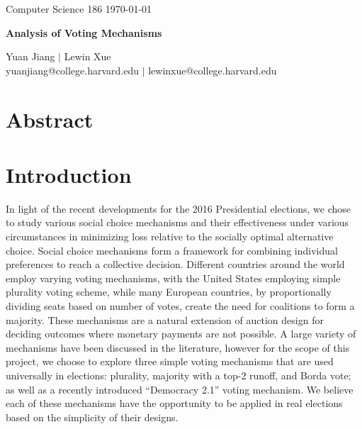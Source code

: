 \documentclass[11pt]{scrartcl}
\begin{document}
\noindent Computer Science 186 \hfill \today\\
\noindent\makebox[\linewidth]{\rule{6.5in}{2.0pt}}

\begin{center}

{{\LARGE \bf Analysis of Voting Mechanisms}}

\noindent\makebox[\linewidth]{\rule{6.5in}{2.0pt}}

\vspace{3mm}

{\large Yuan Jiang $|$ Lewin Xue} \\
\normalsize yuanjiang@college.harvard.edu $|$ lewinxue@college.harvard.edu \\

\end{center}


\vspace{2mm}

\section{Abstract}

\section{Introduction}

In light of the recent developments for the 2016 Presidential elections, we chose to study various social choice mechanisms and their effectiveness under various circumstances in minimizing loss relative to the socially optimal alternative choice. Social choice mechanisms form a framework for combining individual preferences to reach a collective decision. Different countries around the world employ varying voting mechanisms, with the United States employing simple plurality voting scheme, while many European countries, by proportionally dividing seats based on number of votes, create the need for coalitions to form a majority. These mechanisms are a natural extension of auction design for deciding outcomes where monetary payments are not possible. A large variety of mechanisms have been discussed in the literature, however for the scope of this project, we choose to explore three simple voting mechanisms that are used universally in elections: plurality, majority with a top-2 runoff, and Borda vote; as well as a recently introduced ``Democracy 2.1'' voting mechanism. We believe each of these mechanisms have the opportunity to be applied in real elections based on the simplicity of their designs.\\
\end{document}
